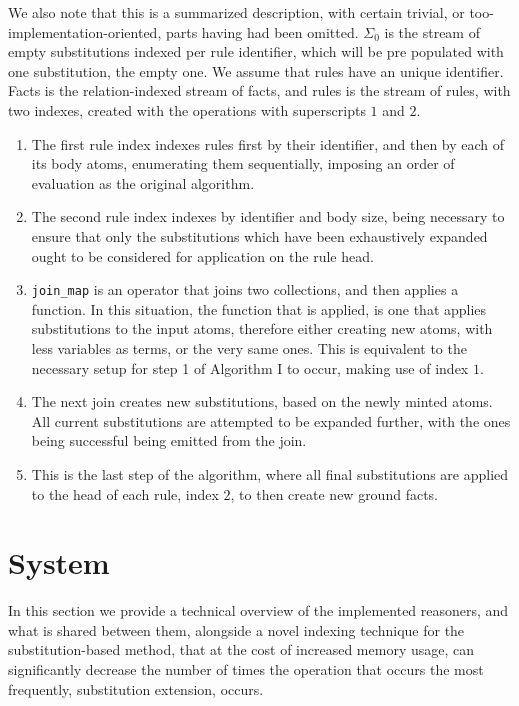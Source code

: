 \documentclass[sigconf,screen,review=false,natbib]{acmart}
\theoremstyle{definition}
\begin{document}
We also note that this is a summarized description, with certain trivial, or too-implementation-oriented, parts
having had been omitted. $\Sigma_0$ is the stream of empty substitutions indexed per rule identifier, which will
be pre populated with one substitution, the empty one. We assume that rules have an unique identifier. Facts is
the relation-indexed stream of facts, and rules is the stream of rules, with two indexes, created with the operations
with superscripts $1$ and $2$.
\begin{enumerate}
	\item The first rule index indexes rules first by their identifier, and then by each of its body atoms, enumerating
	      them sequentially, imposing an order of evaluation as the original algorithm.
	\item The second rule index indexes by identifier and body size, being necessary to ensure that only the substitutions
	      which have been exhaustively expanded ought to be considered for application on the rule head.
	\item \verb|join_map| is an operator that joins two collections, and then applies a function. In this situation, the
	      function that is applied, is one that applies substitutions to the input atoms, therefore either creating new
	      atoms, with less variables as terms, or the very same ones. This is equivalent to the necessary setup for step 1
	      of Algorithm I to occur, making use of index $1$.
	\item The next join creates new substitutions, based on the newly minted atoms. All current substitutions are attempted
	      to be expanded further, with the ones being successful being emitted from the join.
	\item This is the last step of the algorithm, where all final substitutions are applied to the head of each rule, index
	      $2$, to then create new ground facts.
\end{enumerate}
\section{System}
In this section we provide a technical overview of the implemented reasoners, and what is shared between them, alongside
a novel indexing technique for the substitution-based method, that at the cost of increased memory usage, can significantly
decrease the number of times the operation that occurs the most frequently, substitution extension, occurs.
\end{document}
